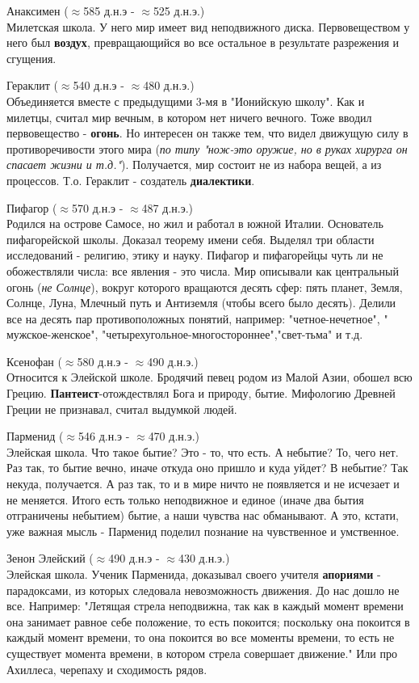 \documentclass[12pt,a4paper]{article}
\begin{document}
Анаксимен ($\approx$585 д.н.э - $\approx$525 д.н.э.)\\
Милетская школа. У него мир имеет вид неподвижного диска. Первовеществом у него был \textbf{воздух}, превращающийся во все остальное в результате разрежения и сгущения.

Гераклит ($\approx$540 д.н.э - $\approx$480 д.н.э.)\\
Объединяется вместе с предыдущими 3-мя в "Ионийскую школу". Как и милетцы, считал мир вечным, в котором нет ничего вечного. Тоже вводил первовещество -  \textbf{огонь}. Но интересен он также тем, что видел движущую силу в противоречивости этого мира (\textit{по типу "нож-это оружие, но в руках хирурга он спасает жизни и т.д."}). Получается, мир состоит не из набора вещей, а из процессов. Т.о. Гераклит - создатель \textbf{диалектики}. 

Пифагор ($\approx$570 д.н.э - $\approx$487 д.н.э.)\\
Родился на острове Самосе, но жил и работал в южной Италии. Основатель пифагорейской школы. Доказал теорему имени себя. Выделял три области исследований - религию, этику и науку. Пифагор и пифагорейцы чуть ли не обожествляли числа: все явления - это числа. Мир описывали как центральный огонь (\textit{не Солнце}), вокруг которого вращаются десять сфер: пять планет, Земля, Солнце, Луна, Млечный путь и Антиземля (чтобы всего было десять). Делили все на десять пар противоположных понятий, например: "четное-нечетное", " мужское-женское", "четырехугольное-многостороннее","свет-тьма" и т.д.

Ксенофан ($\approx$580 д.н.э - $\approx$490 д.н.э.)\\ 
Относится к Элейской школе. Бродячий певец родом из Малой Азии, обошел всю Грецию. \textbf{Пантеист}-отождествлял Бога и природу, бытие. Мифологию Древней Греции не признавал, считал выдумкой людей.

Парменид ($\approx$546 д.н.э - $\approx$470 д.н.э.)\\
Элейская школа. Что такое бытие? Это - то, что есть. А небытие? То, чего нет. Раз так, то бытие вечно, иначе откуда оно пришло и куда уйдет? В небытие? Так некуда, получается. А раз так, то и в мире ничто не появляется и не исчезает и не меняется. Итого есть только неподвижное и единое (иначе два бытия отграничены небытием) бытие, а наши чувства нас обманывают. А это, кстати, уже важная мысль - Парменид поделил познание на чувственное и умственное. 

Зенон Элейский ($\approx$490 д.н.э - $\approx$430 д.н.э.)\\ 
Элейская школа. Ученик Парменида, доказывал своего учителя \textbf{апориями} - парадоксами, из которых следовала невозможность движения. До нас дошло не все. Например: "Летящая стрела неподвижна, так как в каждый момент времени она занимает равное себе положение, то есть покоится; поскольку она покоится в каждый момент времени, то она покоится во все моменты времени, то есть не существует момента времени, в котором стрела совершает движение." Или про Ахиллеса, черепаху и сходимость рядов.
\end{document}
